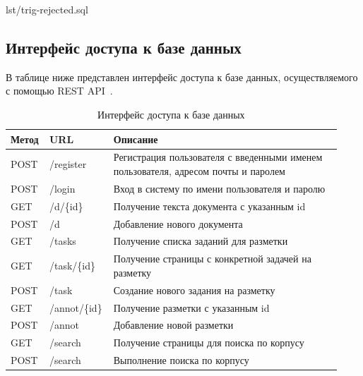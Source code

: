 \begin{code}
    \begin{lstinputlisting}[
            label={lst:test:trig:rejected},
            caption={Уменьшение уровня доверия пользователя при отклонении его разметки},
        ]{lst/trig-rejected.sql}
    \end{lstinputlisting}
\end{code}

\subsection{Интерфейс доступа к базе данных}

В таблице ниже представлен интерфейс доступа к базе данных, осуществляемого с помощью REST API~\cite{restapi}.

\begin{table}[H]
\centering
\caption{Интерфейс доступа к базе данных}
\begin{tabular}{|m{0.1\linewidth}|m{0.16\linewidth}|m{0.67\linewidth}|}
\hline
    \textbf{Метод} & \textbf{URL} & \textbf{Описание} \\ \hline
    POST & /register & Регистрация пользователя с введенными именем пользователя, адресом почты и паролем \\ \hline
    POST & /login & Вход в систему по имени пользователя и паролю \\ \hline
    GET & /d/\{id\} & Получение текста документа с указанным id \\ \hline
    POST & /d & Добавление нового документа \\ \hline
    GET & /tasks & Получение списка заданий для разметки \\ \hline
    GET & /task/\{id\} & Получение страницы с конкретной задачей на разметку \\ \hline
    POST & /task & Создание нового задания на разметку \\ \hline
    GET & /annot/\{id\} & Получение разметки с указанным id \\ \hline
    POST & /annot & Добавление новой разметки \\ \hline
    GET & /search & Получение страницы для поиска по корпусу \\ \hline
    POST & /search & Выполнение поиска по корпусу \\ \hline
\end{tabular}
\label{tab:api}
\end{table}

